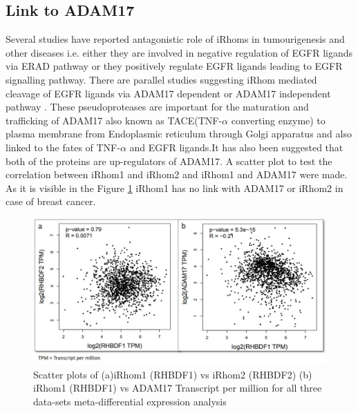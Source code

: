 \documentclass[fleqn,10pt,lineno]{wlpeerj}
\begin{document}
\subsection*{Link to ADAM17}
Several studies have reported antagonistic role of iRhoms in tumourigenesis and other diseases i.e. either they are involved in negative regulation of EGFR ligands via ERAD pathway or they positively regulate EGFR ligands leading to EGFR signalling pathway. There are parallel studies suggesting iRhom mediated cleavage of EGFR ligands via ADAM17 dependent or ADAM17 independent pathway \citep{Al-Salihi2020}. 
These pseudoproteases are important for the maturation and trafficking of ADAM17 also known as TACE(TNF-$\alpha$ converting enzyme) to plasma membrane from Endoplasmic reticulum through Golgi apparatus and also linked to the fates of TNF-$\alpha$   and EGFR ligands\citep{Lee2016}.It has also been suggested that both of the proteins are up-regulators of ADAM17. A scatter plot to test the correlation between iRhom1 and iRhom2 and iRhom1 and ADAM17 were made. As it is visible in the Figure \ref{fig:adam-link} iRhom1 has no link with ADAM17 or iRhom2 in case of breast cancer. 

\begin{figure}[ht]
\centering
\includegraphics[width=\linewidth]{link.jpg}
\caption{Scatter plots of (a)iRhom1 (RHBDF1) vs iRhom2 (RHBDF2) (b) iRhom1 (RHBDF1) vs ADAM17  Transcript per million for all three data-sets meta-differential expression analysis }
\label{fig:adam-link}
\end{figure}
\end{document}
